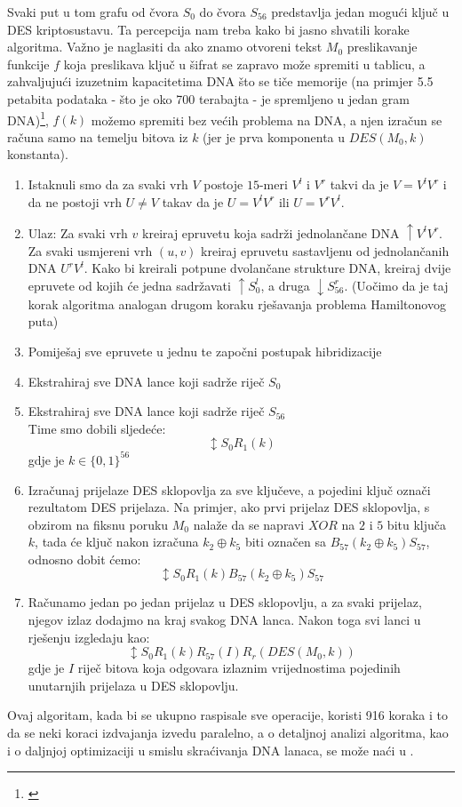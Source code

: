 \documentclass[a4paper,oneside,12pt]{memoir} %
\begin{document}
\begin{spacing}{1.5}
Svaki put u tom grafu od čvora $S_0$ do čvora $S_{56}$ predstavlja jedan mogući ključ u DES kriptosustavu. Ta percepcija nam treba kako bi jasno shvatili korake algoritma. Važno je naglasiti da ako znamo otvoreni tekst $M_0$ preslikavanje funkcije $f$ koja preslikava ključ u šifrat se zapravo može spremiti u tablicu, a zahvaljujući izuzetnim kapacitetima DNA što se tiče memorije (na primjer 5.5 petabita podataka - što je oko 700 terabajta - je spremljeno u jedan gram DNA)\footnote{\cite{Church}}, $f(k)$ možemo spremiti bez većih problema na DNA, a njen izračun se računa samo na temelju bitova iz $k$ (jer je prva komponenta u $DES(M_0,k)$ konstanta).
\begin{enumerate}
\item Istaknuli smo da za svaki vrh $V$ postoje $15$-meri $V^l$ i $V^r$ takvi da je $V=V^lV^r$ i da ne postoji vrh $U \neq V$ takav da je $U=V^lV^r$ ili $U=V^rV^l$.
\item  Ulaz: Za svaki vrh $v$ kreiraj epruvetu koja sadrži jednolančane DNA $\uparrow V^lV^r$. Za svaki usmjereni vrh $(u,v)$ kreiraj epruvetu sastavljenu  od jednolančanih DNA $U^rV^l$. Kako bi kreirali potpune dvolančane strukture DNA, kreiraj dvije epruvete od kojih će jedna sadržavati $\uparrow S_0 ^l$, a druga $\downarrow S_{56}^r$. (Uočimo da je taj korak algoritma analogan drugom koraku rješavanja problema Hamiltonovog puta)
\item Pomiješaj sve epruvete u jednu te započni postupak hibridizacije
\item Ekstrahiraj sve DNA lance koji sadrže riječ $S_0$
\item Ekstrahiraj sve DNA lance koji sadrže riječ $S_{56}$\\
Time smo dobili sljedeće:
\[\updownarrow S_0R_1(k)\]
gdje je $k \in \{0,1\}^{56}$
\item Izračunaj prijelaze DES sklopovlja za sve ključeve, a pojedini ključ označi rezultatom DES prijelaza. Na primjer, ako prvi prijelaz DES sklopovlja, s obzirom na fiksnu poruku $M_0$ nalaže da se napravi $XOR$ na $2$ i $5$ bitu ključa $k$, tada će ključ nakon izračuna $k_2 \oplus k_5$ biti označen sa $B_{57}(k_2 \oplus k_5)S_{57}$, odnosno dobit ćemo:
\[\updownarrow S_0R_1(k)B_{57}(k_2 \oplus k_5)S_{57}\] 
\item Računamo jedan po jedan prijelaz u DES sklopovlju, a za svaki prijelaz, njegov izlaz dodajmo na kraj svakog DNA lanca. Nakon toga svi lanci u rješenju izgledaju kao:
\[\updownarrow S_0R_1(k)R_{57}(I)R_r(DES(M_0,k))\]
gdje je $I$ riječ bitova koja odgovara izlaznim vrijednostima pojedinih unutarnjih prijelaza u DES sklopovlju. 
\end{enumerate} 
Ovaj algoritam, kada bi se ukupno raspisale sve operacije, koristi 916 koraka i to da se neki koraci izdvajanja izvedu paralelno, a o detaljnoj analizi algoritma, kao i o daljnjoj optimizaciji u smislu skraćivanja DNA lanaca, se može naći u \cite{DESbreak}.
\newpage

\end{spacing}
\end{document}
